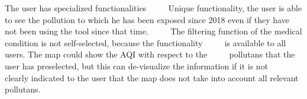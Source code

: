      


\begin{itemize}
  \done The user has specialized functionalities
     \done Unique functionality, the user is able to see the pollution to which he has been exposed since 2018 even if they have not been using the tool since that time.
     \crossed The filtering function of the medical condition is not self-selected, because the functionality
     is available to all users. The map could show the AQI with respect to the
     pollutans that the user has preselected, but this can de-visualize the information if it is not
     clearly indicated to the user that the map does not take into account all relevant pollutans.
\end{itemize}
 \newpage